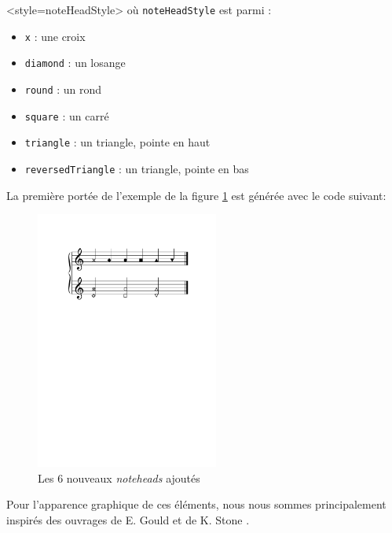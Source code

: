 \documentclass{article}
\newenvironment{gmncode}	{\vspace{-2mm}\small\verbatim}{\endverbatim\vspace{-2mm}}
\newcommand{\code}[1]		{{\small \texttt{#1}}}
\begin{document}
\begin{gmncode}
  \noteFormat<style=noteHeadStyle>
\end{gmncode}
où \code{noteHeadStyle} est parmi :
\begin{itemize}
    \item \code{x} : une croix
    \item \code{diamond} : un losange
    \item \code{round} : un rond
    \item \code{square} : un carré
    \item \code{triangle} : un triangle, pointe en haut
    \item \code{reversedTriangle} : un triangle, pointe en bas
\end{itemize} 

\vspace{2mm}
La première portée de l'exemple de la figure \ref{fig:noteheads} est générée avec le code suivant:
\begin{gmncode}
[
  \noteFormat<style="x"> a
  \noteFormat<style="diamond"> a
  \noteFormat<style="round"> a
  \noteFormat<style="square"> a
  \noteFormat<style="triangle"> a
  \noteFormat<style="reversedTriangle"> a
]
\end{gmncode}
%
\begin{figure}[h]
\centering
\includegraphics[width=6cm]{img/partitions/noteheads.pdf}
\caption{Les 6 nouveaux \emph{noteheads} ajoutés}
\label{fig:noteheads}
\end{figure}
%

Pour l'apparence graphique de ces éléments, nous nous sommes principalement inspirés des ouvrages de E. Gould \cite{gould2011behind} et de K. Stone \cite{stone1980music}.
\end{document}
